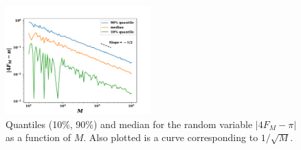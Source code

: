 \documentclass[11pt]{amsart}
\begin{document}
\begin{figure}[htbp]
  \begin{center}
    \includegraphics[width=0.5\textwidth]{FM_stats.pdf}
  \end{center}
  \caption{Quantiles (10\%, 90\%) and median for the random variable $\left| 4 F_M - \pi \right|$ as a function of $M$. Also plotted is a curve corresponding to $1/\sqrt{M}$.}\label{fig:FM}
\end{figure}
\end{document}
